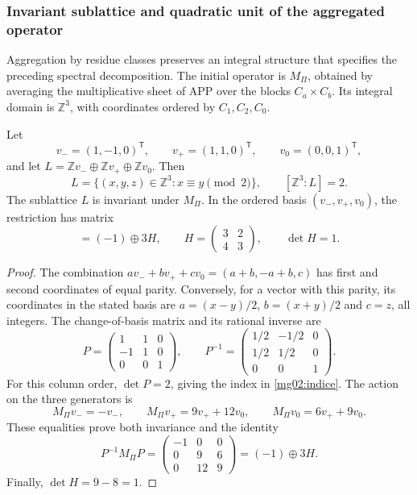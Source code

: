\subsubsection{Invariant sublattice and quadratic unit of the aggregated operator}
\label{mg02:subreticula}

Aggregation by residue classes preserves an integral structure that
specifies the preceding spectral decomposition. The initial operator is
\(M_\Pi\), obtained by averaging the multiplicative sheet of APP over
the blocks \(C_a\times C_b\). Its integral domain is \(\mathbb Z^3\),
with coordinates ordered by \(C_1,C_2,C_0\).

\begin{proposition}
Let
\[
 v_-=(1,-1,0)^{\mathsf T},\qquad
 v_+=(1,1,0)^{\mathsf T},\qquad v_0=(0,0,1)^{\mathsf T},
\]
and let \(L=\mathbb Zv_-\oplus\mathbb Zv_+\oplus\mathbb Zv_0\).
Then
\begin{equation}
 L=\{(x,y,z)\in\mathbb Z^3:x\equiv y\pmod2\},
 \qquad [\mathbb Z^3:L]=2.
 \label{mg02:indice}
\end{equation}
The sublattice \(L\) is invariant under \(M_\Pi\). In the ordered
basis \((v_-,v_+,v_0)\), the restriction has matrix
\begin{equation}
 [M_\Pi|_L]=(-1)\oplus3H,\qquad
 H=\begin{pmatrix}3&2\\4&3\end{pmatrix},\qquad \det H=1.
 \label{mg02:restriccion}
\end{equation}
\end{proposition}

\begin{proof}
The combination \(av_-+bv_++cv_0=(a+b,-a+b,c)\) has first and
second coordinates of equal parity. Conversely, for a vector with this
parity, its coordinates in the stated basis are \(a=(x-y)/2\),
\(b=(x+y)/2\) and \(c=z\), all integers. The change-of-basis matrix
and its rational inverse are
\[
 P=\begin{pmatrix}1&1&0\\-1&1&0\\0&0&1\end{pmatrix},\qquad
 P^{-1}=\begin{pmatrix}1/2&-1/2&0\\1/2&1/2&0\\0&0&1\end{pmatrix}.
\]
For this column order, \(\det P=2\), giving the index in
\eqref{mg02:indice}. The action on the three generators is
\[
 M_\Pi v_-=-v_-,\qquad
 M_\Pi v_+=9v_++12v_0,\qquad
 M_\Pi v_0=6v_++9v_0.
\]
These equalities prove both invariance and the identity
\[
 P^{-1}M_\Pi P=
 \begin{pmatrix}-1&0&0\\0&9&6\\0&12&9\end{pmatrix}
 =(-1)\oplus3H.
\]
Finally, \(\det H=9-8=1\).
\end{proof}

